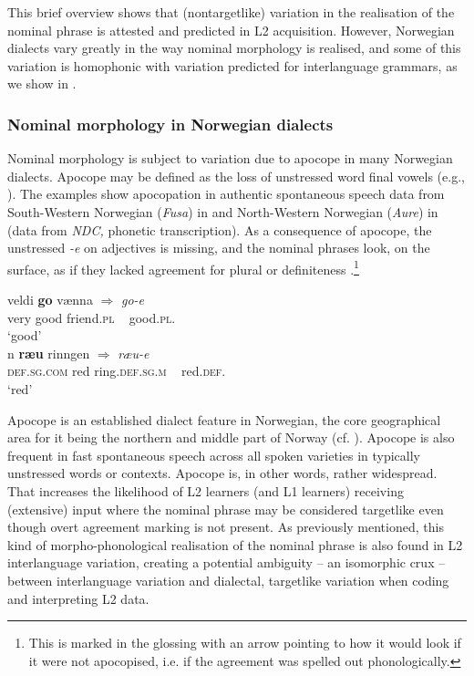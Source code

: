\documentclass[output=paper,colorlinks,citecolor=brown,modfonts,nonflat]{../langscibook}
\begin{document}
This brief overview shows that (nontargetlike) variation in the realisation of the nominal phrase is attested and predicted in L2 acquisition. However, Norwegian dialects vary greatly in the way nominal morphology is realised, and some of this variation is homophonic with variation predicted for interlanguage grammars, as we show in .

\subsubsection{Nominal morphology in Norwegian dialects}\label{sec:emilsen:3.1.3}

Nominal morphology is subject to variation due to apocope in many Norwegian dialects. Apocope may be defined as the loss of unstressed word final vowels (e.g., \citealt[76, 106]{MæhlumRøyneland2012}). The examples show apocopation in authentic spontaneous speech data from South-Western Norwegian (\textit{Fusa}) in  and North-Western Norwegian (\textit{Aure}) in  (data from \textit{NDC,} phonetic transcription). As a consequence of apocope, the unstressed \textit{{}-e} on adjectives is missing, and the nominal phrases look, on the surface, as if they lacked agreement for plural  or definiteness .\footnote{{This is marked in the glossing with an arrow pointing to how it would look if it were not apocopised, i.e. if the agreement was spelled out phonologically.}}


\ea%
    \label{ex:emilsen:3}
\gll veldi \textbf{go} vænna ${\Rightarrow}$ \textit{go-e} \\
 very good  friend.\textsc{pl} ~ good.\textsc{pl}. \\
   ‘good’ \\

\ex%
    \label{ex:emilsen:4}
\gll n \textbf{ræu} rinngen ${\Rightarrow}$ \textit{ræu-e} \\
 \textsc{def}.\textsc{sg}.\textsc{com} red  ring.\textsc{def}.\textsc{sg}.\textsc{m} ~ red.{\textsc{def}}. \\
  \hspace{2.9cm} ‘red’ \\
\z


Apocope is an established dialect feature in Norwegian, the core geographical area for it being the northern and middle part of Norway (cf. \citealt[76]{MæhlumRøyneland2012}). Apocope is also frequent in fast spontaneous speech across all spoken varieties in typically unstressed words or contexts. Apocope is, in other words, rather widespread. That increases the likelihood of L2 learners (and L1 learners) receiving (extensive) input where the nominal phrase may be considered targetlike even though overt agreement marking is not present. As previously mentioned, this kind of morpho-phonological realisation of the nominal phrase is also found in L2 interlanguage variation, creating a potential ambiguity – an isomorphic crux – between interlanguage variation and dialectal, targetlike variation when coding and interpreting L2 data.  
\end{document}
